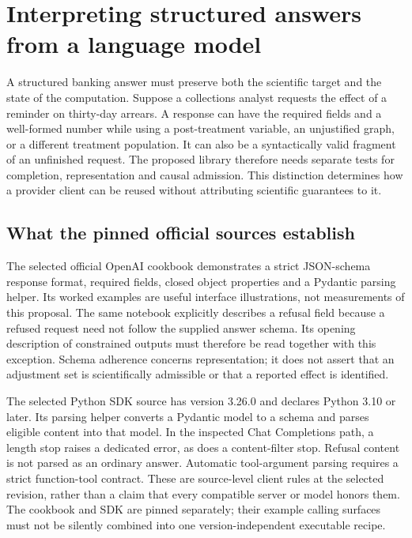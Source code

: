 \section[Structured outputs and scientific admission]{Interpreting structured answers from a language model}
\label{sec:exec28-oa}
A structured banking answer must preserve both the scientific target and the state of the computation.
Suppose a collections analyst requests the effect of a reminder on thirty-day arrears. A response can have
the required fields and a well-formed number while using a post-treatment variable, an unjustified graph,
or a different treatment population. It can also be a syntactically valid fragment of an unfinished request.
The proposed library therefore needs separate tests for completion, representation and causal admission.
This distinction determines how a provider client can be reused without attributing scientific guarantees to it.

\subsection{What the pinned official sources establish}
The selected official OpenAI cookbook demonstrates a strict JSON-schema response format, required fields,
closed object properties and a Pydantic parsing helper. Its worked examples are useful interface illustrations,
not measurements of this proposal. The same notebook explicitly describes a refusal field because a refused
request need not follow the supplied answer schema. Its opening description of constrained outputs must
therefore be read together with this exception. Schema adherence concerns representation; it does not assert
that an adjustment set is scientifically admissible or that a reported effect is identified.~\citep{exec28_oa_cookbook}

The selected Python SDK source has version 3.26.0 and declares Python 3.10 or later. Its parsing helper converts
a Pydantic model to a schema and parses eligible content into that model. In the inspected Chat Completions path,
a length stop raises a dedicated error, as does a content-filter stop. Refusal content is not parsed as an ordinary
answer. Automatic tool-argument parsing requires a strict function-tool contract. These are source-level client
rules at the selected revision, rather than a claim that every compatible server or model honors them.
The cookbook and SDK are pinned separately; their example calling surfaces must not be silently combined into
one version-independent executable recipe.~\citep{exec28_oa_sdk,exec28_oa_cookbook}

